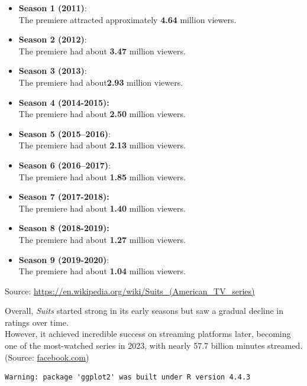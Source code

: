 \documentclass[
  letterpaper,
  DIV=11,
  numbers=noendperiod,
  oneside]{scrartcl}
\begin{document}
\begin{itemize}
\item
  \textbf{Season 1 (2011)}:\\
  The premiere attracted approximately \textbf{4.64} million viewers.
\item
  \textbf{Season 2 (2012)}:\\
  The premiere had about \textbf{3.47} million viewers.
\item
  \textbf{Season 3 (2013)}:\\
  The premiere had about\textbf{2.93} million viewers.
\item
  \textbf{Season 4 (2014-2015):}\\
  The premiere had about \textbf{2.50} million viewers.
\item
  \textbf{Season 5 (2015--2016)}:\\
  The premiere had about \textbf{2.13} million viewers.
\item
  \textbf{Season 6 (2016--2017)}:\\
  The premiere had about \textbf{1.85} million viewers.
\item
  \textbf{Season 7 (2017-2018):}\\
  The premiere had about \textbf{1.40} million viewers.
\item
  \textbf{Season 8 (2018-2019):}\\
  The premiere had about \textbf{1.27} million viewers.
\item
  \textbf{Season 9 (2019-2020)}:\\
  The premiere had about \textbf{1.04} million viewers.
\end{itemize}

Source: \url{https://en.wikipedia.org/wiki/Suits_(American_TV_series)}

Overall, \emph{Suits} started strong in its early seasons but saw a
gradual decline in ratings over time.\\
However, it achieved incredible success on streaming platforms later,
becoming one of the most-watched series in 2023, with nearly 57.7
billion minutes streamed. (Source:
\href{https://www.facebook.com/TheBoardroom/posts/originally-airing-from-2011-to-2019-suits-built-a-loyal-fanbase-during-its-nine-/1133161235490015/?utm_source=chatgpt.com}{facebook.com})

\begin{verbatim}
Warning: package 'ggplot2' was built under R version 4.4.3
\end{verbatim}
\end{document}

